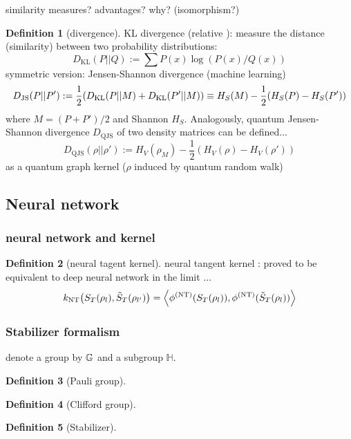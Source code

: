 \documentclass[
10pt,
aps,
pra,
linenumbers,
floatfix,
]{revtex4-2}
\theoremstyle{plain}
\theoremstyle{definition}
\newtheorem{definition}{Definition}
\newcommand{\jsd}{D_\text{JS}}
\newcommand{\qjs}{\text{QJS}}
\newcommand{\kl}{D_\text{KL}}
\newcommand{\ntk}{\textup{NT}}
\newcommand{\subgroup}{\mathbb{H}}
\newcommand{\dm}{\rho}
\begin{document}
similarity measures? advantages? why? (isomorphism?)
\begin{definition}[divergence]\label{def:divergence}
	KL divergence (relative ): measure the distance (similarity) between two probability distributions:
	\begin{equation}
		\kl (P || Q) := \sum P(x) \log (P(x)/Q(x))
	\end{equation}
	symmetric version: Jensen-Shannon divergence (machine learning)
	\begin{equation}
		\jsd (P || P') := \frac{1}{2} \qty(\kl(P|| M) + \kl(P'||M))
		\equiv H_S(M)-\frac{1}{2} (H_S(P) - H_S(P') ) 
	\end{equation}
	where $M=(P+P')/2$ and Shannon  $H_S$.
	Analogously, quantum Jensen-Shannon divergence $D_{\qjs}$ of two density matrices can be defined...
	\begin{equation}
		D_{\qjs}(\dm||\dm'):= 
		H_V(\dm_M) - \frac{1}{2} (H_V(\dm) - H_V(\dm') ) 
	\end{equation}
	as a quantum graph kernel ($\dm$ induced by quantum random walk)
\end{definition}

\subsection{Neural network}\label{sec:neural_network}
\subsubsection{neural network and kernel}
\begin{definition}[neural tagent kernel]\label{def:neural_tangent_kernel}
	neural tangent kernel \cite{jacotNeuralTangentKernel2020}: proved to be equivalent to deep neural network \cite{gaoEfficientRepresentationQuantum2017} in the limit ...
	\begin{equation}
		k_{\ntk} \qty(S_T(\dm_l),\tilde{S}_T(\dm_{l'}))
		=
		\expval{
			\phi^{(\ntk)}(S_T(\dm_l)),
			\phi^{(\ntk)}(\tilde{S}_T(\dm_l))
		}
	\end{equation}
\end{definition}

\subsubsection{Stabilizer formalism}\label{sec:stabilizer_formalism}
denote a group by $\mathbb{G}$ and a subgroup $\subgroup$. 
\begin{definition}[Pauli group]
\end{definition}
\begin{definition}[Clifford group]\label{def:clifford}
\end{definition}
\begin{definition}[Stabilizer]
\end{definition}
\end{document}
